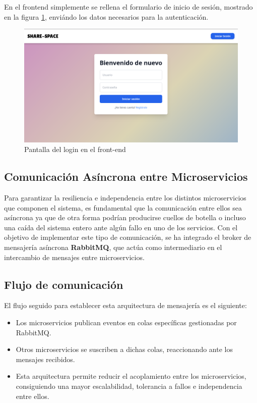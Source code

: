 En el frontend simplemente se rellena el formulario de inicio de sesión, mostrado en la figura \ref{fig:loginFront}, enviándo los datos necesarios para la autenticación.
\begin{figure}[H]
  \centering
  \includegraphics[width=1\textwidth]{fotos/login.png}
  \caption{Pantalla del login en el front-end}
  \label{fig:loginFront}
\end{figure}


\subsection{Comunicación Asíncrona entre Microservicios}

Para garantizar la resiliencia e independencia entre los distintos microservicios que componen el sistema, es fundamental que la comunicación entre ellos sea asíncrona ya que de otra forma podrían producirse cuellos de botella o incluso una caída del sistema entero ante algún fallo en uno de los servicios.
Con el objetivo de implementar este tipo de comunicación, se ha integrado el broker de mensajería asíncrona \textbf{RabbitMQ}, que actúa como intermediario en el intercambio de mensajes entre microservicios.

\subsection*{Flujo de comunicación}

El flujo seguido para establecer esta arquitectura de mensajería es el siguiente:

\begin{itemize}
    \item Los microservicios publican eventos en colas específicas gestionadas por RabbitMQ.
    \item Otros microservicios se suscriben a dichas colas, reaccionando ante los mensajes recibidos.
    \item Esta arquitectura permite reducir el acoplamiento entre los microservicios, consiguiendo una mayor escalabilidad, tolerancia a fallos e independencia entre ellos.
\end{itemize}

